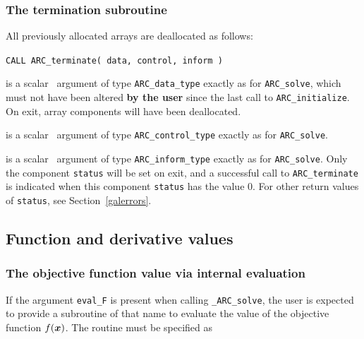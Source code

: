 \documentclass{galahad}
\newcommand{\packagename}{ARC}
\newcommand{\fullpackagename}{\libraryname\_\packagename}
\newcommand{\solver}{{\tt \fullpackagename\_solve}}
\begin{document}

\subsubsection{The  termination subroutine}
All previously allocated arrays are deallocated as follows:
\vspace*{1mm}

\hspace{8mm}
{\tt CALL \packagename\_terminate( data, control, inform )}

\vspace*{-1mm}
\begin{description}

 is a scalar \intentinout\ argument of type
{\tt \packagename\_data\_type}
exactly as for
{\tt \packagename\_solve},
which must not have been altered {\bf by the user} since the last call to
{\tt \packagename\_initialize}.
On exit, array components will have been deallocated.

 is a scalar \intentin\ argument of type
{\tt \packagename\_control\_type}
exactly as for
{\tt \packagename\_solve}.

 is a scalar \intentout\ argument of type
{\tt \packagename\_inform\_type}
exactly as for
{\tt \packagename\_solve}.
Only the component {\tt status} will be set on exit, and a
successful call to
{\tt \packagename\_terminate}
is indicated when this  component {\tt status} has the value 0.
For other return values of {\tt status}, see Section~\ref{galerrors}.

\end{description}


\subsection{Function and derivative values\label{fdv}}


\subsubsection{The objective function value via internal evaluation\label{ffv}}

If the argument {\tt eval\_F} is present when calling \solver, the
user is expected to provide a subroutine of that name to evaluate the
value of the objective function $f({\bm{x}})$.
The routine must be specified as
\end{document}
